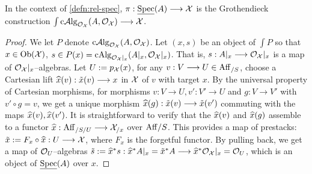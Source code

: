\documentclass[11pt]{amsart}
\begin{document}
\begin{prop}\label{prop:rel-spec-Gr-cons}
In the context of \cref{defn:rel-spec}, $\pi : \ul\Spec(A) \to \mcX$
is the Grothendieck construction
$\int \CCAlg_{\mcO_\mcX}(A, \mcO_\mcX) \to \mcX$.
\end{prop}
\begin{proof}
We let $P$ denote $\mathrm{c}\mathcal{A}\mathrm{lg}_{\mathcal{O}_\mathcal{X}}(A, \mathcal{O}_\mathcal{X})$.
Let $(x, s)$ be an object of $\int P$ so that $x \in \Ob{\mcX}$,
$s \in P(x) = \mathrm{cAlg}_{\mathcal{O}_\mathcal{X}|_x}(A|_x, \mathcal{O}_\mathcal{X}|_x)$. That is,
$s : A|_x \to \mcO_\mcX|_x$ is a map of $\mathcal{O}_\mathcal{X}|_x$--algebras.
Let $U := p_\mathcal{X}(x)$, for any $v : V \to U \in \Aff_{/S}$, choose a Cartesian
lift $\wh{x}(v) : \tilde{x}(v) \to x$ in $\mathcal{X}$ of $v$ with target $x$.
By the universal property of Cartesian morphisms, for morphisms
$v : V \to U, v' : V' \to U$ and $g : V \to V'$ with $v' \circ g = v$,
we get a unique morphism $\wh{x}(g) : \tilde{x}(v) \to \tilde{x}(v')$
commuting with the maps $\widehat{x}(v), \widehat{x}(v')$. It is straightforward to verify
that the $\widehat{x}(v)$ and $\widehat{x}(g)$ assemble to a functor
$\wh{x} : \Aff_{/S/U} \to \mcX_{/x}$ over $\mathrm{Aff}/S$. This provides a map
of prestacks: $\tilde{x} := F_x \circ \wh{x} : U \to \mcX$, where
$F_x$ is the forgetful functor.
By pulling back, we get a map of $\mathcal{O}_U$--algebras
$\tilde{s} := \wh{x}^*s : \wh{x}^*A|_x = \tilde{x}^*A \to
\wh{x}^*\mcO_\mcX|_x = \mcO_U$, which is an object of $\underline{\mathrm{Spec}}(A)$ over $x$.


\end{proof}
\end{document}
